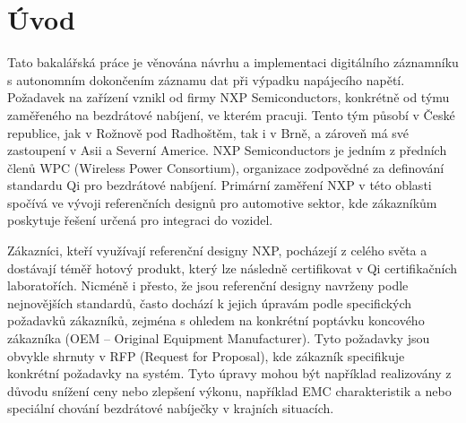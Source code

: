 
%


\chapter{Úvod}
\label{uvod}
Tato bakalářská práce je věnována návrhu a implementaci digitálního záznamníku s autonomním dokončením záznamu dat při výpadku napájecího napětí. Požadavek na zařízení vznikl od firmy NXP Semiconductors, konkrétně od týmu zaměřeného na bezdrátové nabíjení, ve kterém pracuji. Tento tým působí v České republice, jak v Rožnově pod Radhoštěm, tak i v Brně, a zároveň má své zastoupení v Asii a Severní Americe. NXP Semiconductors je jedním z předních členů WPC (Wireless Power Consortium), organizace zodpovědné za definování standardu Qi pro bezdrátové nabíjení. Primární zaměření NXP v této oblasti spočívá ve vývoji referenčních designů pro automotive sektor, kde zákazníkům poskytuje řešení určená pro integraci do vozidel.

Zákazníci, kteří využívají referenční designy NXP, pocházejí z celého světa a dostávají téměř hotový produkt, který lze následně certifikovat v Qi certifikačních laboratořích. Nicméně i přesto, že jsou referenční designy navrženy podle nejnovějších standardů, často dochází k jejich úpravám podle specifických požadavků zákazníků, zejména s ohledem na konkrétní poptávku koncového zákazníka (OEM – Original Equipment Manufacturer). Tyto požadavky jsou obvykle shrnuty v RFP (Request for Proposal), kde zákazník specifikuje konkrétní požadavky na systém. Tyto úpravy mohou být například realizovány z důvodu snížení ceny nebo zlepšení výkonu, například EMC charakteristik a nebo speciální chování bezdrátové nabíječky v krajních situacích. 

